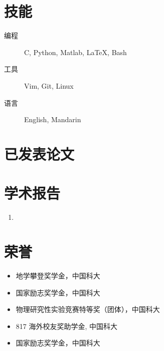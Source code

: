 \documentclass{mycv_cn}
\begin{document}
\section{技能}

\begin{description}
  \item[编程] C, Python,  Matlab, \LaTeX, Bash
  \item[工具] Vim, Git, Linux
  \item[语言] English, Mandarin
\end{description}

\section{已发表论文}
\section{学术报告}

\begin{enumerate}
  \item
\end{enumerate}

\section{荣誉}

\begin{itemize}
  \item 地学攀登奖学金，中国科大 
  \item 国家励志奖学金，中国科大 
  \item 物理研究性实验竞赛特等奖（团体），中国科大 
  \item 817 海外校友奖助学金, 中国科大 
  \item 国家励志奖学金，中国科大 
\end{itemize}
\end{document}
